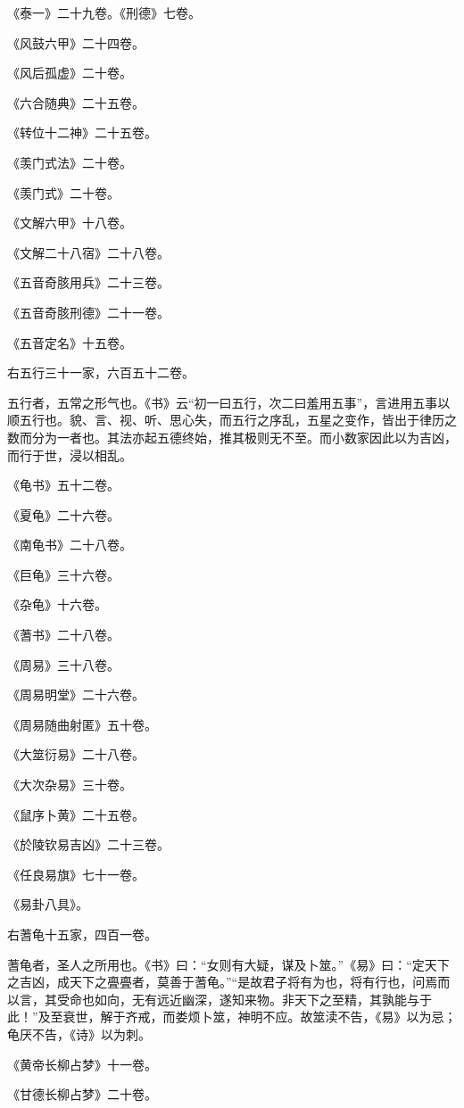 \documentclass[]{article}
\begin{document}
《泰一》二十九卷。《刑德》七卷。

《风鼓六甲》二十四卷。

《风后孤虚》二十卷。

《六合随典》二十五卷。

《转位十二神》二十五卷。

《羡门式法》二十卷。

《羡门式》二十卷。

《文解六甲》十八卷。

《文解二十八宿》二十八卷。

《五音奇胲用兵》二十三卷。

《五音奇胲刑德》二十一卷。

《五音定名》十五卷。

右五行三十一家，六百五十二卷。

五行者，五常之形气也。《书》云``初一曰五行，次二曰羞用五事''，言进用五事以顺五行也。貌、言、视、听、思心失，而五行之序乱，五星之变作，皆出于律历之数而分为一者也。其法亦起五德终始，推其极则无不至。而小数家因此以为吉凶，而行于世，浸以相乱。

《龟书》五十二卷。

《夏龟》二十六卷。

《南龟书》二十八卷。

《巨龟》三十六卷。

《杂龟》十六卷。

《蓍书》二十八卷。

《周易》三十八卷。

《周易明堂》二十六卷。

《周易随曲射匿》五十卷。

《大筮衍易》二十八卷。

《大次杂易》三十卷。

《鼠序卜黄》二十五卷。

《於陵钦易吉凶》二十三卷。

《任良易旗》七十一卷。

《易卦八具》。

右蓍龟十五家，四百一卷。

蓍龟者，圣人之所用也。《书》曰：``女则有大疑，谋及卜筮。''《易》曰：``定天下之吉凶，成天下之亹亹者，莫善于蓍龟。''``是故君子将有为也，将有行也，问焉而以言，其受命也如向，无有远近幽深，遂知来物。非天下之至精，其孰能与于此！''及至衰世，解于齐戒，而娄烦卜筮，神明不应。故筮渎不告，《易》以为忌；龟厌不告，《诗》以为刺。

《黄帝长柳占梦》十一卷。

《甘德长柳占梦》二十卷。
\end{document}
